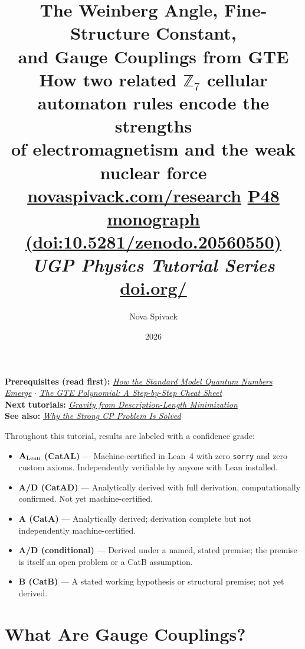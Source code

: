 \documentclass[11pt,a4paper]{article}
\title{\textbf{The Weinberg Angle, Fine-Structure Constant,\\
and Gauge Couplings from GTE}\\[6pt]
\large How two related $\mathbb{Z}_7$ cellular automaton rules encode the strengths\\
of electromagnetism and the weak nuclear force\\[8pt]
\normalsize
\href{https://novaspivack.com/research}{novaspivack.com/research}\quad
\href{https://doi.org/10.5281/zenodo.20560550}{P48 monograph (doi:10.5281/zenodo.20560550)}\\[4pt]\normalsize\textit{UGP Physics Tutorial Series}
\\[2pt]\small\href{https://doi.org/\TutorialDOI}{doi.org/\TutorialDOI}}
\author{Nova Spivack}
\date{2026}
\begin{document}
\setcounter{tocdepth}{2}
\maketitle
\tableofcontents
\newpage

\begin{tcolorbox}[colback=blue!6,colframe=blue!40!black,
  title=\textbf{UGP Physics Tutorial Series}]
\textbf{Prerequisites (read first):} \href{https://doi.org/10.5281/zenodo.20657898}{\emph{How the Standard Model Quantum Numbers Emerge}} $\cdot$ \href{https://doi.org/10.5281/zenodo.20657889}{\emph{The GTE Polynomial: A Step-by-Step Cheat Sheet}}\\[4pt]
\textbf{Next tutorials:} \href{https://doi.org/10.5281/zenodo.20657870}{\emph{Gravity from Description-Length Minimization}}\\[4pt]
\textbf{See also:} \href{https://doi.org/10.5281/zenodo.20657902}{\emph{Why the Strong CP Problem Is Solved}}
\end{tcolorbox}

\begin{tcolorbox}[colback=boxgreen,colframe=green!50!black,
  title=\textbf{Claim-Strength Taxonomy}]
Throughout this tutorial, results are labeled with a confidence grade:
\begin{itemize}[itemsep=2pt]
  \item \textbf{$\mathbf{A}_{\rm Lean}$ (CatAL)} --- Machine-certified in Lean~4 with zero \texttt{sorry} and zero custom axioms.  Independently verifiable by anyone with Lean installed.
  \item \textbf{A/D (CatAD)} --- Analytically derived with full derivation, computationally confirmed.  Not yet machine-certified.
  \item \textbf{A (CatA)} --- Analytically derived; derivation complete but not independently machine-certified.
  \item \textbf{A/D (conditional)} --- Derived under a named, stated premise; the premise is itself an open problem or a CatB assumption.
  \item \textbf{B (CatB)} --- A stated working hypothesis or structural premise; not yet derived.
\end{itemize}
\end{tcolorbox}


\section{What Are Gauge Couplings?}
\end{document}

